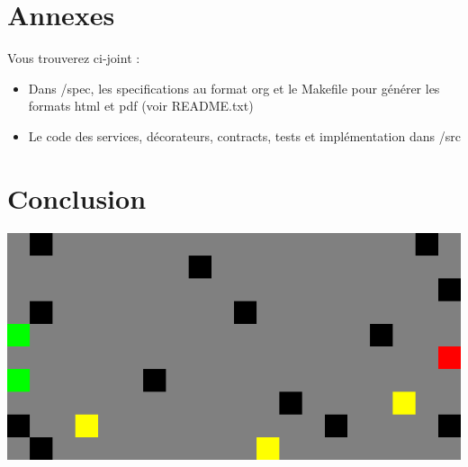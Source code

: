 \documentclass[a4paper,titlepage,openany,12pt]{report}
\begin{document}
\section*{Annexes}

Vous trouverez ci-joint :
\begin{itemize}
\item Dans /spec, les specifications au format org et le Makefile pour générer les formats html et pdf (voir README.txt)
\item Le code des services, décorateurs, contracts, tests et implémentation dans /src
\end{itemize}

\section*{Conclusion}

\includegraphics[scale=0.3]{../saved}
\end{document}

